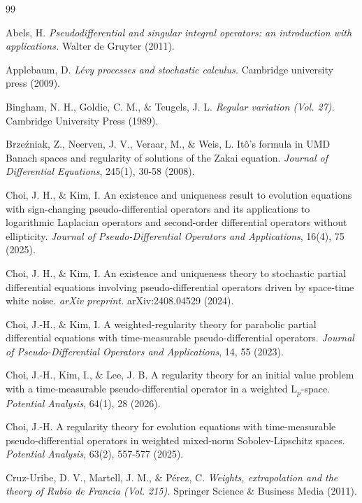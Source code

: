 \documentclass[11pt,reqno]{amsart}
\theoremstyle{definition}
\theoremstyle{remark}
\numberwithin{equation}{section}
\begin{document}
\begin{thebibliography}{99}


Abels, H.  
\textit{Pseudodifferential and singular integral operators: an introduction with applications.} 
Walter de Gruyter (2011).

Applebaum, D.  
\textit{Lévy processes and stochastic calculus.}
Cambridge university press (2009).


Bingham, N. H., Goldie, C. M., $\&$ Teugels, J. L.  
\textit{Regular variation (Vol. 27).}
Cambridge University Press (1989).


Brzeźniak, Z., Neerven, J. V., Veraar, M., $\&$ Weis, L. 
Itô's formula in UMD Banach spaces and regularity of solutions of the Zakai equation. 
\textit{Journal of Differential Equations}, 245(1), 30-58  (2008).


Choi, J. H., $\&$ Kim, I.  
An existence and uniqueness result to evolution equations with sign-changing pseudo-differential operators and its applications to logarithmic Laplacian operators and second-order differential operators without ellipticity. 
 \textit{Journal of Pseudo-Differential Operators and Applications}, 16(4), 75 (2025). 

Choi, J. H., $\&$ Kim, I.  
An existence and uniqueness theory to stochastic partial differential equations involving pseudo-differential operators driven by space-time white noise. 
\textit{arXiv preprint.} arXiv:2408.04529 (2024).


Choi, J.-H., $\&$ Kim, I.
A weighted-regularity theory for parabolic partial differential equations with time-measurable pseudo-differential operators. 
\textit{Journal of Pseudo-Differential Operators and Applications},
14, 55 (2023). 


Choi, J.-H., Kim, I., $\&$ Lee, J. B.
A regularity theory for an initial value problem with a time-measurable pseudo-differential operator in a weighted $\mathrm{L}_p$-space. 
\textit{Potential Analysis}, 64(1), 28 (2026).



Choi, J.-H.
A regularity theory for evolution equations with time-measurable pseudo-differential operators in weighted mixed-norm Sobolev-Lipschitz spaces. 
\textit{Potential Analysis}, 63(2), 557-577 (2025).


Cruz-Uribe, D. V., Martell, J. M., $\&$ Pérez, C.  
\textit{Weights, extrapolation and the theory of Rubio de Francia (Vol. 215).}
Springer Science $\&$ Business Media (2011).




\end{thebibliography}
\end{document}
